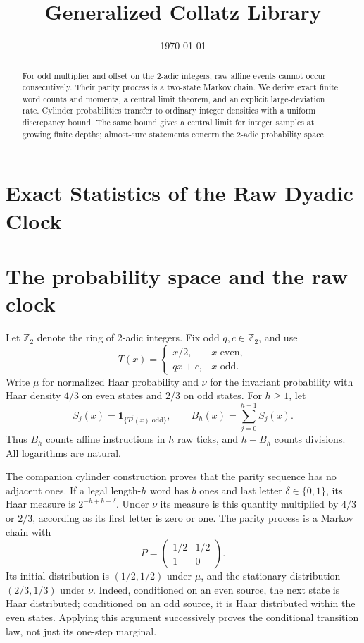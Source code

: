 \documentclass[11pt,letterpaper]{article}
\title{Generalized Collatz Library}
\author{}
\date{\today}
\newcommand{\Z}{\mathbb{Z}}
\begin{document}
\maketitle
\section*{Exact Statistics of the Raw Dyadic Clock}

\begin{abstract}
For odd multiplier and offset on the 2-adic integers, raw affine events
cannot occur consecutively. Their parity process is a two-state Markov
chain. We derive exact finite word counts and moments, a central limit
theorem, and an explicit large-deviation rate. Cylinder probabilities
transfer to ordinary integer densities with a uniform discrepancy
bound. The same bound gives a central limit for integer samples at
growing finite depths; almost-sure statements concern the 2-adic
probability space.
\end{abstract}

\section{The probability space and the raw clock}

Let \(\Z_2\) denote the ring of 2-adic integers. Fix odd
\(q,c\in\Z_2\), and use
\[
T(x)=\begin{cases}x/2,&x\text{ even},\\qx+c,&x\text{ odd}.\end{cases}
\]
Write \(\mu\) for normalized Haar probability and \(\nu\) for the
invariant probability with Haar density \(4/3\) on even states and
\(2/3\) on odd states. For \(h\ge1\), let
\[
S_j(x)=\boldsymbol{1}_{\{T^j(x)\text{ odd}\}},\qquad
B_h(x)=\sum_{j=0}^{h-1}S_j(x).
\]
Thus \(B_h\) counts affine instructions in \(h\) raw ticks, and
\(h-B_h\) counts divisions. All logarithms are natural.

The companion cylinder construction \cite{DyadicTopology26} proves
that the parity sequence has no adjacent ones. If a legal length-\(h\)
word has \(b\) ones and last letter \(\delta\in\{0,1\}\), its Haar
measure is \(2^{-h+b-\delta}\). Under \(\nu\) its measure is this
quantity multiplied by \(4/3\) or \(2/3\), according as its first
letter is zero or one. The parity process is a Markov chain with
\[
P=\begin{pmatrix}1/2&1/2\\1&0\end{pmatrix}.
\]
Its initial distribution is \((1/2,1/2)\) under \(\mu\), and the
stationary distribution \((2/3,1/3)\) under \(\nu\).
Indeed, conditioned on an even source, the next state is Haar
distributed; conditioned on an odd source, it is Haar distributed
within the even states. Applying this argument successively proves
the conditional transition law, not just its one-step marginal.
\end{document}
